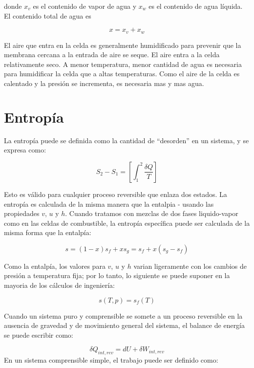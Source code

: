 \documentclass[12pt]{book}
\theoremstyle{definition}
\theoremstyle{remark}
\theoremstyle{plain}
\begin{document}
donde $x_v$ es el contenido de vapor de agua y $x_w$ es el contenido de agua líquida. El
contenido total de agua es

\begin{equation}
 \label{equ324}
x = x_v + x_w
\end{equation}

El aire que entra en la celda es generalmente  humidificado para prevenir que la membrana
cercana a la entrada de aire se seque. El aire entra a la celda relativamente seco. A 
menor temperatura, menor cantidad de agua es necesaria para humidificar la celda que a
altas temperaturas. Como el aire de la celda es calentado y la presión se incrementa, es
necesaria mas y mas agua. 

\section{Entropía}

La entropía puede se definida como la cantidad de ``desorden'' en un sistema, y se 
expresa como:

\begin{equation}
 \label{equ325}
S_2-S_1 = \left [ \int_1^2 \frac{\delta Q}{T} \right]
\end{equation}

Esto es válido para cualquier proceso reversible que enlaza dos estados. La entropía
es calculada de la misma manera que la entalpia - usando las propiedades $v$, $u$ y $h$.
Cuando tratamos con mezclas de dos fases liquido-vapor como en las celdas de combustible,
la entropía específica puede ser calculada de la misma forma que la entalpía:

\begin{equation}
 \label{equ326}
s = (1-x) s_f + x s_g = s_f + x (s_g - s_f)
\end{equation}

Como la entalpía, los valores para $v$, $u$ y $h$ varian ligeramente con los cambios
de presión a temperatura fija; por lo tanto, lo siguiente se puede suponer en la 
mayoria de los cálculos de ingeniería:

\begin{equation}
 \label{equ327}
s(T, p)=s_f(T)
\end{equation}

Cuando un sistema puro y comprensible se somete a un proceso reversible en la ausencia
de gravedad y de movimiento general del sistema, el balance de energía se puede escribir
como:

\begin{equation}
 \label{equ328}
\delta Q_{int,rev}= d U + \delta W_{int,rev}
\end{equation}
En un sistema comprensible simple, el trabajo puede ser definido como:
\end{document}
